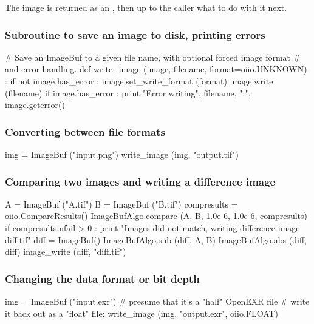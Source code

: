 \noindent The image is returned as an \ImageBuf, then up to the caller 
what to do with it next.

\subsubsection*{Subroutine to save an image to disk, printing errors}
\begin{code}
    # Save an ImageBuf to a given file name, with optional forced image format
    # and error handling.
    def write_image (image, filename, format=oiio.UNKNOWN) :
        if not image.has_error :
            image.set_write_format (format)
            image.write (filename)
        if image.has_error :
            print "Error writing", filename, ":", image.geterror()
\end{code}


\subsubsection*{Converting between file formats}

\begin{code}
    img = ImageBuf ("input.png")
    write_image (img, "output.tif")
\end{code}


\subsubsection*{Comparing two images and writing a difference image}

\begin{code}
    A = ImageBuf ("A.tif")
    B = ImageBuf ("B.tif")
    compresults = oiio.CompareResults()
    ImageBufAlgo.compare (A, B, 1.0e-6, 1.0e-6, compresults)
    if compresults.nfail > 0 :
        print "Images did not match, writing difference image diff.tif"
        diff = ImageBuf()
        ImageBufAlgo.sub (diff, A, B)
        ImageBufAlgo.abs (diff, diff)
        image_write (diff, "diff.tif")
\end{code}


\subsubsection*{Changing the data format or bit depth}

\begin{code}
    img = ImageBuf ("input.exr")
    # presume that it's a "half" OpenEXR file
    # write it back out as a "float" file:
    write_image (img, "output.exr", oiio.FLOAT)
\end{code}


